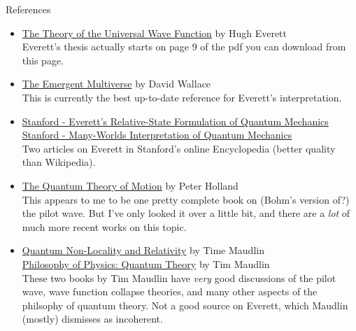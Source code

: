 \documentclass[9pt,usenames,dvipsnames]{beamer}
\begin{document}
\begin{frame}[t]{References}
\vspace{0pt}
\begin{itemize}
\item \href{http://ucispace.lib.uci.edu/handle/10575/1302}
    {The Theory of the Universal Wave Function} by Hugh Everett\\
    Everett's thesis actually starts on page 9 of the pdf you can download
    from this page.

\item \href{https://www.goodreads.com/book/show/13688768-emergent-multiverse}
    {The Emergent Multiverse} by David Wallace\\
    This is currently the best up-to-date reference for Everett's
    interpretation.

\item \href{http://plato.stanford.edu/entries/qm-everett/\#7}
    {Stanford - Everett's Relative-State Formulation of Quantum Mechanics}\\
    \href{http://plato.stanford.edu/entries/qm-manyworlds/}
    {Stanford - Many-Worlds Interpretation of Quantum Mechanics}\\
    Two articles on Everett in Stanford's online Encyclopedia
    (better quality than Wikipedia).

\item \href{https://www.goodreads.com/book/show/1334044.The\_Quantum\_Theory\_of\_Motion}{The Quantum Theory of Motion} by Peter Holland\\
    This appears to me to be one pretty complete book on (Bohm's version of?)
    the pilot wave. But I've only looked it over a little bit, and there
    are a {\it lot} of much more recent works on this topic.

\item \href{https://www.barnesandnoble.com/w/quantum-non-locality-and-relativity-tim-maudlin/1100226576?ean=9781444331271}{Quantum Non-Locality and Relativity} by Time Maudlin\\
    \href{https://www.barnesandnoble.com/w/philosophy-of-physics-tim-maudlin/1128567493?ean=9780691183527}{Philosophy of Physics: Quantum Theory} by Tim Maudlin\\
    These two books by Tim Maudlin have {\it very} good discussions of the pilot wave, wave function collapse theories, and many other aspects of the philsophy of quantum theory. Not a good source on Everett, which Maudlin (mostly) dismisses as incoherent.
\end{itemize}
\end{frame}
\end{document}
